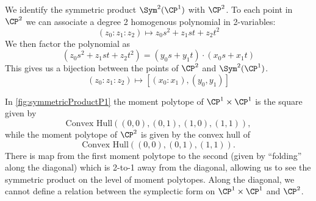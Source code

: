 


    We identify the symmetric product $\Sym^2(\CP^1)$ with $\CP^2$. To each point in $\CP^2$ we can associate a degree 2 homogenous polynomial in 2-variables:
    \[(z_0:z_1:z_2)\mapsto z_0 s^2 + z_1 st + z_2 t^2\]
    We then factor the polynomial as
    \[( z_0 s^2 + z_1 st + z_2 t^2)=(y_0 s + y_1 t)\cdot (x_0 s + x_1 t)\]
    This gives us a bijection between the points of $\CP^2$ and $\Sym^2(\CP^1)$. 
    \[(z_0:z_1:z_2)\mapsto [(x_0:x_1), (y_0,y_1)]\]
    
    In \cref{fig:symmetricProductP1}  the moment polytope of $\CP^1\times \CP^1$ is the square given by 
    \[\text{Convex Hull}((0,0), (0,1), (1, 0), (1, 1)),\]
    while the moment polytope of $\CP^2$ is given by the convex hull of
    \[\text{Convex Hull}((0,0), (0,1), (1,1)).\]
    There is map from the first moment polytope to the second (given by ``folding'' along the diagonal) which is 2-to-1 away from the diagonal, allowing us to see the symmetric product on the level of moment polytopes. Along the diagonal, we cannot define a relation between the symplectic form on $\CP^1\times \CP^1$ and $\CP^2$.

    
    
